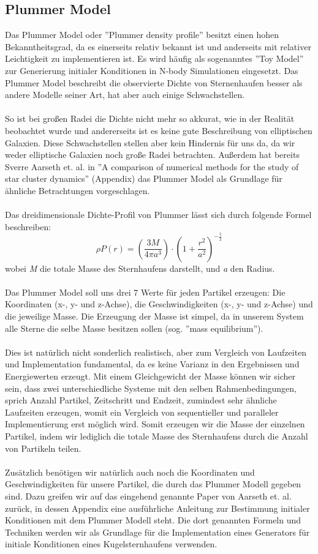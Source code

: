 \documentclass[
	12pt,
	a4paper,
	BCOR10mm,
	DIV14,
	headsepline,
	usegeometry,
]{scrreprt}
\begin{document}
\subsection{Plummer Model}
Das Plummer Model oder ''Plummer density profile'' besitzt einen hohen Bekanntheitsgrad, da es einerseits relativ bekannt ist und anderseits mit relativer Leichtigkeit zu implementieren ist. Es wird häufig als sogenanntes ''Toy Model'' zur Generierung initialer Konditionen in N-body Simulationen eingesetzt. Das Plummer Model beschreibt die observierte Dichte von Sternenhaufen besser als andere Modelle seiner Art, hat aber auch einige Schwachstellen. \\\\ So ist bei großen Radei die Dichte nicht mehr so akkurat, wie in der Realität beobachtet wurde und andererseits ist es keine gute Beschreibung von elliptischen Galaxien. Diese Schwachstellen stellen aber kein Hindernis für uns da, da wir weder elliptische Galaxien noch große Radei betrachten. Außerdem hat bereits Sverre Aarseth et. al. in ''A comparison of numerical methods for the study of star cluster dynamics'' \cite{aarseth}(Appendix) das Plummer Model als Grundlage für ähnliche Betrachtungen vorgeschlagen. \\\\ Das dreidimensionale Dichte-Profil von Plummer lässt sich durch folgende Formel beschreiben: $$ \rho P(r) = (\frac{3M}{4\pi a^{3}}) \cdot (1 + \frac{r^{2}}{a^{2}})^{-\frac{5}{2}} $$ wobei \textit{M} die totale Masse des Sternhaufens darstellt, und \textit{a} den Radius. \\\\ Das Plummer Model soll uns drei 7 Werte für jeden Partikel erzeugen: Die Koordinaten (x-, y- und z-Achse), die Geschwindigkeiten (x-, y- und z-Achse) und die jeweilige Masse. Die Erzeugung der Masse ist simpel, da in unserem System alle Sterne die selbe Masse besitzen sollen (sog. ''mass equilibrium''). \\\\ Dies ist natürlich nicht sonderlich realistisch, aber zum Vergleich von Laufzeiten und Implementation fundamental, da es keine Varianz in den Ergebnissen und Energiewerten erzeugt. Mit einem Gleichgewicht der Masse können wir sicher sein, dass zwei unterschiedliche Systeme mit den selben Rahmenbedingungen, sprich Anzahl Partikel, Zeitschritt und Endzeit, zumindest sehr ähnliche Laufzeiten erzeugen, womit ein Vergleich von sequentieller und paralleler Implementierung erst möglich wird. Somit erzeugen wir die Masse der einzelnen Partikel, indem wir lediglich die totale Masse des Sternhaufens durch die Anzahl von Partikeln teilen. \\\\ Zusätzlich benötigen wir natürlich auch noch die Koordinaten und Geschwindigkeiten für unsere Partikel, die durch das Plummer Modell gegeben sind. Dazu greifen wir auf das eingehend genannte Paper von Aarseth et. al. \cite{aarseth} zurück, in dessen Appendix eine ausführliche Anleitung zur Bestimmung initialer Konditionen mit dem Plummer Modell steht. Die dort genannten Formeln und Techniken werden wir als Grundlage für die Implementation eines Generators für initiale Konditionen eines Kugelsternhaufens verwenden.
\end{document}
